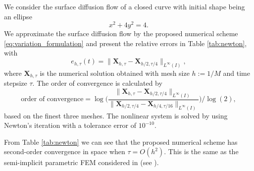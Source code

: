 \documentclass[review]{elsarticle}
\begin{document}
We consider the surface diffusion flow of a closed curve with initial shape being an ellipse
$$x^2+4y^2=4.$$
We approximate the surface diffusion flow by the proposed numerical scheme \eqref{eq:variation_formulation} and present the relative errors in Table \ref{tab:newton}, with
\begin{equation}
    e_{h, \tau}(t) = \|\mathbf{X}_{h,\tau} - \mathbf{X}_{h/2, \tau/4}\|_{L^{\infty}(I)} ,
\end{equation}
where $\mathbf{X}_{h, \tau}$ is the numerical solution obtained with mesh size $h:=1/M$ and time stepsize $\tau$. The order of convergence is calculated by
\begin{equation*}
\mbox{order of convergence}
= \log \bigg(\frac{\|\mathbf{X}_{h,\tau} - \mathbf{X}_{h/2, \tau/4}\|_{L^{\infty}(I)}}{\| \mathbf{X}_{h/2, \tau/4} - \mathbf{X}_{h/4, \tau/16}\|_{L^{\infty}(I)}}\bigg)\bigg/\log(2) ,
\end{equation*}
based on the finest three meshes. The nonlinear system is solved by using Newton's iteration with a tolerance error of $10^{-10}$.

From Table \ref{tab:newton} we can see that the proposed numerical scheme has second-order convergence in space when $\tau=O(h^2)$. This is the same as the semi-implicit parametric FEM considered in \cite{Bao17} (see \cite[Table 1 on p. 389]{Bao17}).

\end{document}
